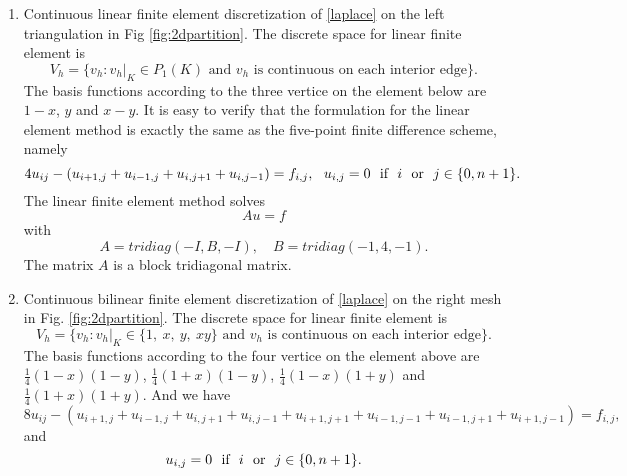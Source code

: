 \begin{enumerate}
\item Continuous linear finite element discretization of
\eqref{laplace} on the left triangulation in Fig \ref{fig:2dpartition}. The discrete space for linear finite element is 
$$
V_h=\{v_h: v_h|_K\in P_1(K) \text{ and } v_h \text{ is continuous on each interior edge}\}.
$$ 
The basis functions according to the three vertice on the element below are $1-x$, $y$ and $x-y$.
It is easy to verify that the formulation for the linear element method is exactly the same as the five-point finite difference scheme, namely 
\begin{equation}
  \label{2d-fe0}
4u_{ij}-(u_{i+1,j}+u_{i-1,j}+u_{i,j+1}+u_{i,j-1})=f_{i,j},~~u_{i,j}=0~~\hbox{if}~~i ~~\hbox{or}~~ j\in \{0, n+1\}.
\end{equation}
The linear finite element method solves
\begin{equation}
\label{laplace}
Au=f
\end{equation}
with
\begin{equation}
  \label{2d-fd}
A=tridiag (-I, B, -I), \quad B=tridiag (-1, 4, -1).
\end{equation}
The matrix $A$ is a block tridiagonal matrix. 

\begin{figure}[!ht]
\begin{center}
\end{center}
\end{figure}
\item Continuous bilinear finite element discretization of
\eqref{laplace} on the right mesh in 
Fig. \ref{fig:2dpartition}. The discrete space for linear finite element is 
$$
V_h=\{v_h: v_h|_K\in \{1,\ x,\ y,\ xy \} \text{ and } v_h \text{ is continuous on each interior edge}\}.
$$ 
The basis functions according to the four vertice on the element above 
are $\frac{1}{4}(1-x)(1-y)$, $\frac{1}{4}(1+x)(1-y)$, $\frac{1}{4}(1-x)(1+y)$ and $\frac{1}{4}(1+x)(1+y)$. 
And we have
\begin{equation}
  \label{2d-fe1}
8u_{ij}-(u_{i+1,j}+u_{i-1,j}+u_{i,j+1}+u_{i,j-1}+u_{i+1,j+1}+u_{i-1,j-1}+u_{i-1,j+1}+u_{i+1,j-1})=f_{i,j},
\end{equation}
and 
$$
u_{i,j}=0~~\hbox{if}~~i ~~\hbox{or}~~ j\in \{0, n+1\}.
$$


\end{enumerate}

